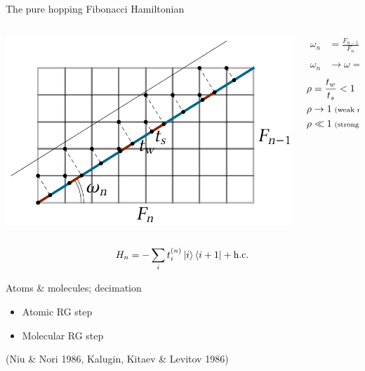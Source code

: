 \documentclass[xcolor=x11names,compress,professionalfonts]{beamer}
\renewcommand{\(}{\begin{columns}}
\renewcommand{\)}{\end{columns}}
\newcommand{\<}[1]{\begin{column}{#1}}
\renewcommand{\>}{\end{column}}
\newcommand{\ham}{\ensuremath{H}}
\begin{document}
\begin{frame}{The pure hopping Fibonacci Hamiltonian}
\begin{columns}
\begin{column}{8.5cm}
	\centering
	\includegraphics[scale=.65]{cut_and_project.pdf}
\end{column}

\begin{column}{3cm}
\begin{align*}
\omega_n &= \frac{F_{n-1}}{F_{n}} \\
\omega_n &\rightarrow \omega = \frac{\sqrt{5}-1}{2}
\end{align*}
\begin{align*}
\rho &= \frac{t_w}{t_s} < 1 \\
\rho &\rightarrow 1 \scriptsize{\text{ (weak modulation)}} \\
\rho &\ll 1 \scriptsize{\text{ (strong modulation)}}
\end{align*}
\end{column}
\end{columns}

	\[ \ham_n = - \sum_i t_i^{(n)} \ket{i} \bra{i+1} + \text{h.c.} \]
\end{frame}

\begin{frame}{Atoms \& molecules; decimation}
	\centering
	\begin{itemize}
	\item Atomic RG step 
	\item Molecular RG step 
	\end{itemize}
	\begin{flushright}
	(Niu \& Nori 1986, Kalugin, Kitaev \& Levitov 1986)
	\end{flushright}
\end{frame}
\end{document}
